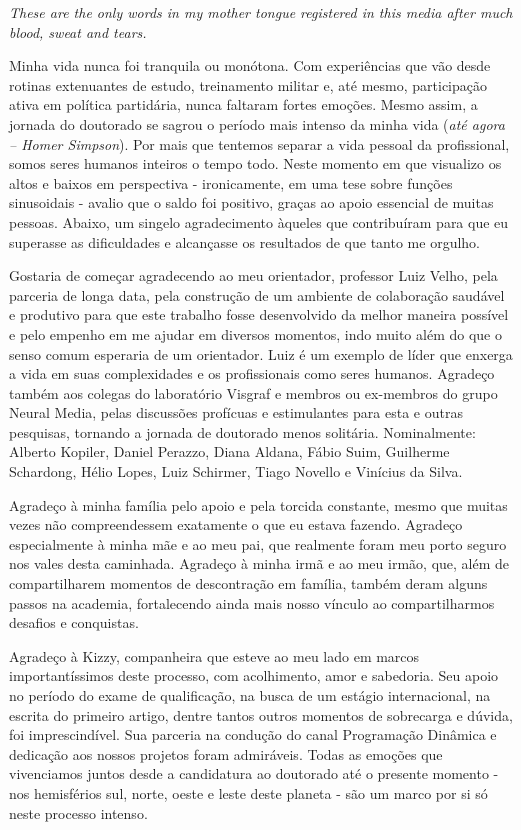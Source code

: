\textit{These are the only words in my mother tongue registered in this media after much blood, sweat and tears.}

Minha vida nunca foi tranquila ou monótona. Com experiências que vão desde rotinas extenuantes de estudo, treinamento militar e, até mesmo, participação ativa em política partidária, nunca faltaram fortes emoções. Mesmo assim, a jornada do doutorado se sagrou o período mais intenso da minha vida (\textit{até agora – Homer Simpson}). Por mais que tentemos separar a vida pessoal da profissional, somos seres humanos inteiros o tempo todo. Neste momento em que visualizo os altos e baixos em perspectiva - ironicamente, em uma tese sobre funções sinusoidais - avalio que o saldo foi positivo, graças ao apoio essencial de muitas pessoas. Abaixo, um singelo agradecimento àqueles que contribuíram para que eu superasse as dificuldades e alcançasse os resultados de que tanto me orgulho.

Gostaria de começar agradecendo ao meu orientador, professor Luiz Velho, pela parceria de longa data, pela construção de um ambiente de colaboração saudável e produtivo para que este trabalho fosse desenvolvido da melhor maneira possível e pelo empenho em me ajudar em diversos momentos, indo muito além do que o senso comum esperaria de um orientador. Luiz é um exemplo de líder que enxerga a vida em suas complexidades e os profissionais como seres humanos. Agradeço também aos colegas do laboratório Visgraf e membros ou ex-membros do grupo Neural Media, pelas discussões profícuas e estimulantes para esta e outras pesquisas, tornando a jornada de doutorado menos solitária. Nominalmente: Alberto Kopiler, Daniel Perazzo, Diana Aldana, Fábio Suim, Guilherme Schardong, Hélio Lopes, Luiz Schirmer, Tiago Novello e Vinícius da Silva.

Agradeço à minha família pelo apoio e pela torcida constante, mesmo que muitas vezes não compreendessem exatamente o que eu estava fazendo. Agradeço especialmente à minha mãe e ao meu pai, que realmente foram meu porto seguro nos vales desta caminhada. Agradeço à minha irmã e ao meu irmão, que, além de compartilharem momentos de descontração em família, também deram alguns passos na academia, fortalecendo ainda mais nosso vínculo ao compartilharmos desafios e conquistas.

Agradeço à Kizzy, companheira que esteve ao meu lado em marcos importantíssimos deste processo, com acolhimento, amor e sabedoria. Seu apoio no período do exame de qualificação, na busca de um estágio internacional, na escrita do primeiro artigo, dentre tantos outros momentos de sobrecarga e dúvida, foi imprescindível. Sua parceria na condução do canal Programação Dinâmica e dedicação aos nossos projetos foram admiráveis. Todas as emoções que vivenciamos juntos desde a candidatura ao doutorado até o presente momento - nos hemisférios sul, norte, oeste e leste deste planeta - são um marco por si só neste processo intenso.

